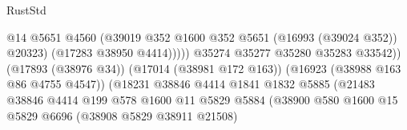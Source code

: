 \begin{lexlean}{RustStd}
\begin{coremodule}
                                                            @14
                                                            @5651
                                                            @4560
                                                            (@39019
                                                              @352
                                                              @1600
                                                              @352
                                                              @5651
                                                              (@16993 (@39024 @352))
                                                              @20323)
                                                            (@17283 @38950 @4414)))))
                                                    @35274
                                                    @35277
                                                    @35280
                                                    @35283
                                                    @33542))
                                                (@17893 (@38976 @34))
                                                (@17014 (@38981 @172 @163))
                                                (@16923 (@38988 @163 @86 @4755 @4547))
                                                (@18231
                                                  @38846
                                                  @4414
                                                  @1841
                                                  @1832
                                                  @5885
                                                  (@21483
                                                    @38846
                                                    @4414
                                                    @199
                                                    @578
                                                    @1600
                                                    @11
                                                    @5829
                                                    @5884
                                                    (@38900
                                                      @580
                                                      @1600
                                                      @15
                                                      @5829
                                                      @6696
                                                      (@38908 @5829 @38911 @21508)

\end{coremodule}
\end{lexlean}
